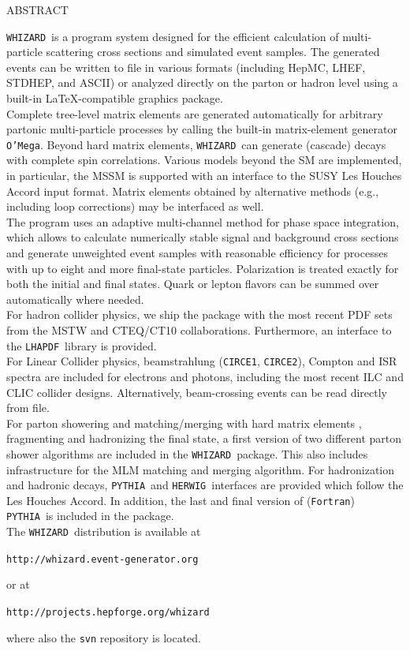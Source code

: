 \documentclass[12pt]{book}
\makeatletter
\newif\if@preliminary
\def\abstract#1{\def\@abstract{#1}}
\newcommand\abstractname{ABSTRACT}
\newlength\preprintnoskip
\newlength\abstractwidth
\renewcommand\maketitle{\begin{titlepage}%
  \let\footnotesize\small
  \hfill\parbox{\preprintnoskip}{%
  \begin{flushright}\@preprintno\end{flushright}}\hspace*{1cm}
  \vskip 60\p@
  \begin{center}%
    {\Large\bf\boldmath \@title \par}\vskip 1cm%
    {\sc\@author \par}\vskip 3mm%
    {\@address \par}%
    \if@preliminary
      \vskip 2cm {\large\sf PRELIMINARY DRAFT \par \@date}%
    \fi
  \end{center}\par
  \@thanks
  \vfill
  \begin{center}%
    \parbox{\abstractwidth}{\centerline{\abstractname}%
    \vskip 3mm%
    \@abstract}
  \end{center}
  \end{titlepage}%
  \setcounter{footnote}{0}%
  \let\thanks\relax\let\maketitle\relax
  \gdef\@thanks{}\gdef\@author{}\gdef\@address{}%
  \gdef\@title{}\gdef\@abstract{}\gdef\@preprintno{}
}%
\newcommand{\whizard}{\texttt{WHIZARD}}
\newcommand{\oMega}{\texttt{O'Mega}}
\newcommand{\herwig}{\texttt{HERWIG}}
\newcommand{\pythia}{\texttt{PYTHIA}}
\newcommand{\circeone}{\texttt{CIRCE1}}
\newcommand{\circetwo}{\texttt{CIRCE2}}
\newcommand{\lhapdf}{\texttt{LHAPDF}}
\newcommand{\fortran}{\texttt{Fortran}}
\makeatother
\begin{document}
\abstract{%
\whizard\ is a program system designed for the efficient calculation
of multi-particle scattering cross sections and simulated event
samples.  The generated events can be written to file in various formats
(including HepMC, LHEF, STDHEP, and ASCII) or analyzed directly on the
parton or hadron level using a built-in \LaTeX-compatible graphics
package. 
\\[\baselineskip]
Complete tree-level matrix elements are generated automatically for arbitrary
partonic multi-particle processes by calling the built-in matrix-element
generator \oMega.  Beyond hard matrix elements, \whizard\ can generate
(cascade) decays with complete spin correlations.
Various models beyond the SM are implemented, in particular,
the MSSM is supported with an interface to the SUSY Les Houches Accord
input format.  Matrix elements obtained by alternative methods (e.g.,
including loop corrections) may be interfaced as well.  
\\[\baselineskip]
The program uses an adaptive multi-channel method for phase space
integration, which allows to calculate numerically stable signal and
background cross sections and generate unweighted event samples with
reasonable efficiency for processes with up to eight and more
final-state particles.  Polarization is treated exactly for both the
initial and final states.  Quark or lepton flavors can be
summed over automatically where needed.  
\\[\baselineskip]
For hadron collider physics, we ship the package with the most recent
PDF sets from the MSTW and CTEQ/CT10 collaborations. Furthermore, an
interface to the \lhapdf\ library is provided.
\\[\baselineskip]
For Linear Collider physics,
beamstrahlung (\circeone, \circetwo), Compton and ISR spectra are
included for electrons and photons, including the most recent ILC and
CLIC collider designs. Alternatively, beam-crossing events can be read
directly from file. 
\\[\baselineskip]
For parton showering and matching/merging with hard matrix elements ,
fragmenting and hadronizing the final state, a first version of two
different parton shower algorithms are included in the \whizard\
package. This also includes infrastructure for the MLM matching and
merging algorithm. For hadronization and hadronic decays, \pythia\ 
and \herwig\ interfaces are provided which follow the Les Houches
Accord. In addition, the last and final version of (\fortran) \pythia\
is included in the package. 
\\[\baselineskip]
The \whizard\ distribution is available at
\begin{center}
  \texttt{http://whizard.event-generator.org}
\end{center}
or at
\begin{center}
  \texttt{http://projects.hepforge.org/whizard} 
\end{center}
where also the \texttt{svn} repository is located.
}
%
\maketitle
\end{document}
